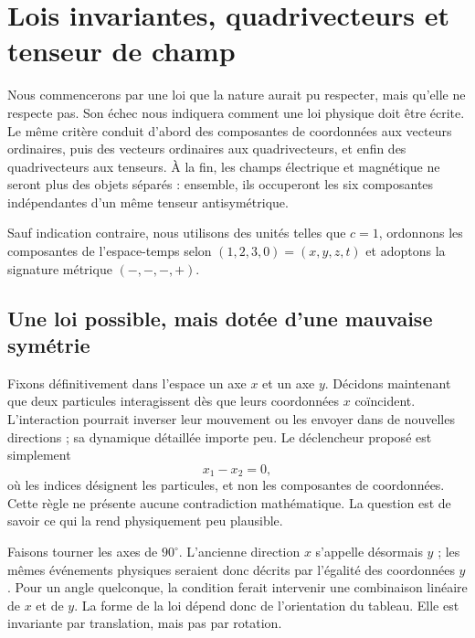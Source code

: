\chapter{Lois invariantes, quadrivecteurs et tenseur de champ}

Nous commencerons par une loi que la nature aurait pu respecter, mais qu’elle ne respecte pas. Son échec nous indiquera comment une loi physique doit être écrite. Le même critère conduit d’abord des composantes de coordonnées aux vecteurs ordinaires, puis des vecteurs ordinaires aux quadrivecteurs, et enfin des quadrivecteurs aux tenseurs. À la fin, les champs électrique et magnétique ne seront plus des objets séparés : ensemble, ils occuperont les six composantes indépendantes d’un même tenseur antisymétrique.

Sauf indication contraire, nous utilisons des unités telles que \(c=1\), ordonnons les composantes de l’espace-temps selon \((1,2,3,0)=(x,y,z,t)\) et adoptons la signature métrique \((-,-,-,+)\).

\section{Une loi possible, mais dotée d’une mauvaise symétrie}

Fixons définitivement dans l’espace un axe \(x\) et un axe \(y\). Décidons maintenant que deux particules interagissent dès que leurs coordonnées \(x\) coïncident. L’interaction pourrait inverser leur mouvement ou les envoyer dans de nouvelles directions ; sa dynamique détaillée importe peu. Le déclencheur proposé est simplement \begin{equation}
  x_1-x_2=0,
\end{equation} où les indices désignent les particules, et non les composantes de coordonnées. Cette règle ne présente aucune contradiction mathématique. La question est de savoir ce qui la rend physiquement peu plausible.

\begin{classroomqa}\end{classroomqa}

Faisons tourner les axes de \(90^\circ\). L’ancienne direction \(x\) s’appelle désormais \(y\) ; les mêmes événements physiques seraient donc décrits par l’égalité des coordonnées \(y\). Pour un angle quelconque, la condition ferait intervenir une combinaison linéaire de \(x\) et de \(y\). La forme de la loi dépend donc de l’orientation du tableau. Elle est invariante par translation, mais pas par rotation.

